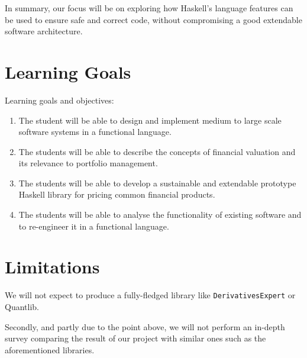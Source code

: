 \documentclass[11pt]{article}
\newcommand{\comm}[2]{{\sf \(\spadesuit\){\bf #1: }{\rm \sf #2}\(\spadesuit\)}}
\newcommand{\mcomm}[2]{\marginpar{\scriptsize \comm{#1}{#2}}}
\newcommand{\ab}[1]{\mcomm{AB}{#1}}
\begin{document}
In summary, our focus will be on exploring how Haskell's language features can be used
to ensure safe and correct code, without compromising a good extendable software architecture.

\section*{Learning Goals}

Learning goals and objectives:

\begin{enumerate}
\item The student will be able to design and implement medium to large scale software systems in a functional language. %
\item The students will be able to describe the concepts of financial valuation and its relevance to portfolio management. %
\item The students will be able to develop a sustainable and extendable prototype Haskell library for pricing common financial products. %
\item The students will be able to analyse the functionality of existing software and to re-engineer it in a functional language.
\end{enumerate}

\section*{Limitations}

We will not expect to produce a fully-fledged library like {\tt DerivativesExpert} or Quantlib\cite{Ame2003}.

Secondly, and partly due to the point above, we will not perform an in-depth survey
comparing the result of our project with similar ones such as the aforementioned libraries.\\



\end{document}

